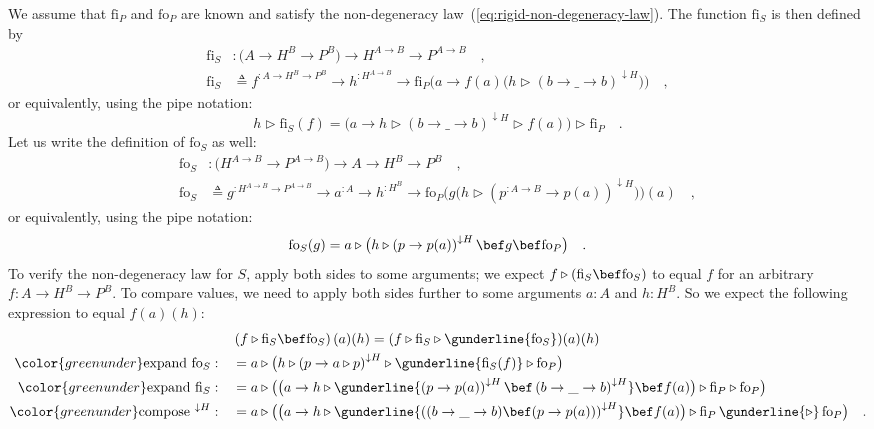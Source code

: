 We assume that $\text{fi}_{P}$ and $\text{fo}_{P}$ are known and
satisfy the non-degeneracy law~(\ref{eq:rigid-non-degeneracy-law}).
The function $\text{fi}_{S}$ is then defined by
\begin{align*}
\text{fi}_{S} & :\big(A\rightarrow H^{B}\rightarrow P^{B}\big)\rightarrow H^{A\rightarrow B}\rightarrow P^{A\rightarrow B}\quad,\\
\text{fi}_{S} & \triangleq f^{:A\rightarrow H^{B}\rightarrow P^{B}}\rightarrow h^{:H^{A\rightarrow B}}\rightarrow\text{fi}_{P}\big(a\rightarrow f(a)\big(h\triangleright(b\rightarrow\_\rightarrow b)^{\downarrow H}\big)\big)\quad,
\end{align*}
or equivalently, using the pipe notation:
\[
h\triangleright\text{fi}_{S}(f)=\big(a\rightarrow h\triangleright\left(b\rightarrow\_\rightarrow b\right)^{\downarrow H}\triangleright f(a)\big)\triangleright\text{fi}_{P}\quad.
\]
Let us write the definition of $\text{fo}_{S}$ as well:
\begin{align*}
\text{fo}_{S} & :\big(H^{A\rightarrow B}\rightarrow P^{A\rightarrow B}\big)\rightarrow A\rightarrow H^{B}\rightarrow P^{B}\quad,\\
\text{fo}_{S} & \triangleq g^{:H^{A\rightarrow B}\rightarrow P^{A\rightarrow B}}\rightarrow a^{:A}\rightarrow h^{:H^{B}}\rightarrow\text{fo}_{P}\big(g\big(h\triangleright(p^{:A\rightarrow B}\rightarrow p(a))^{\downarrow H}\big)\big)(a)\quad,
\end{align*}
or equivalently, using the pipe notation:
\[
\text{fo}_{S}(g)=a\triangleright\big(h\triangleright\left(p\rightarrow p(a)\right)^{\downarrow H}\bef g\bef\text{fo}_{P}\big)\quad.
\]
To verify the non-degeneracy law for $S$, apply both sides to some
arguments; we expect $f\triangleright(\text{fi}_{S}\bef\text{fo}_{S})$
to equal $f$ for an arbitrary $f:A\rightarrow H^{B}\rightarrow P^{B}$.
To compare values, we need to apply both sides further to some arguments
$a:A$ and $h:H^{B}$. So we expect the following expression to equal
$f(a)(h)$:
\begin{align*}
\quad & \left(f\triangleright\text{fi}_{S}\bef\text{fo}_{S}\right)(a)(h)=(f\triangleright\text{fi}_{S}\triangleright\gunderline{\text{fo}_{S}})(a)(h)\\
{\color{greenunder}\text{expand }\text{fo}_{S}:}\quad & =a\triangleright\big(h\triangleright\left(p\rightarrow a\triangleright p\right)^{\downarrow H}\triangleright\gunderline{\text{fi}_{S}(f)}\triangleright\text{fo}_{P}\big)\\
{\color{greenunder}\text{expand }\text{fi}_{S}:}\quad & =a\triangleright\big(\big(a\rightarrow h\triangleright\gunderline{\left(p\rightarrow p(a)\right)^{\downarrow H}\bef\left(b\rightarrow\_\rightarrow b\right)^{\downarrow H}}\bef f(a)\big)\triangleright\text{fi}_{P}\triangleright\text{fo}_{P}\big)\\
{\color{greenunder}\text{compose }^{\downarrow H}:}\quad & =a\triangleright\big(\big(a\rightarrow h\triangleright\gunderline{\left((b\rightarrow\_\rightarrow b)\bef(p\rightarrow p(a))\right)^{\downarrow H}}\bef f(a)\big)\triangleright\text{fi}_{P}\,\gunderline{\triangleright}\,\text{fo}_{P}\big)\quad.
\end{align*}
